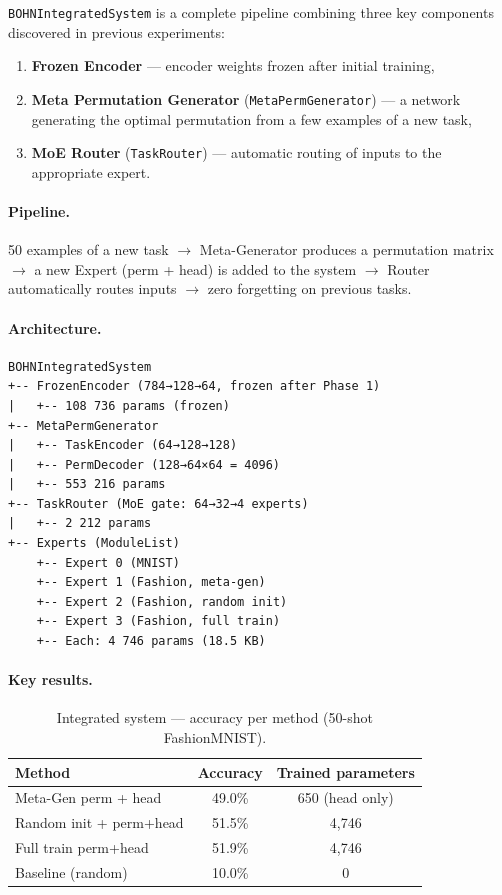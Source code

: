 \documentclass[11pt,a4paper]{report}
\begin{document}
\texttt{BOHNIntegratedSystem} is a complete pipeline combining three key components
discovered in previous experiments:

\begin{enumerate}
    \item \textbf{Frozen Encoder} --- encoder weights frozen after initial training,
    \item \textbf{Meta Permutation Generator} (\texttt{MetaPermGenerator}) --- a network generating the optimal permutation from a few examples of a new task,
    \item \textbf{MoE Router} (\texttt{TaskRouter}) --- automatic routing of inputs to the appropriate expert.
\end{enumerate}

\paragraph{Pipeline.}
50 examples of a new task $\to$ Meta-Generator produces a permutation matrix
$\to$ a new Expert (perm + head) is added to the system
$\to$ Router automatically routes inputs
$\to$ zero forgetting on previous tasks.

\paragraph{Architecture.}

\begin{verbatim}
BOHNIntegratedSystem
+-- FrozenEncoder (784→128→64, frozen after Phase 1)
|   +-- 108 736 params (frozen)
+-- MetaPermGenerator
|   +-- TaskEncoder (64→128→128)
|   +-- PermDecoder (128→64×64 = 4096)
|   +-- 553 216 params
+-- TaskRouter (MoE gate: 64→32→4 experts)
|   +-- 2 212 params
+-- Experts (ModuleList)
    +-- Expert 0 (MNIST)
    +-- Expert 1 (Fashion, meta-gen)
    +-- Expert 2 (Fashion, random init)
    +-- Expert 3 (Fashion, full train)
    +-- Each: 4 746 params (18.5 KB)
\end{verbatim}

\paragraph{Key results.}

\begin{table}[h!]
\centering
\caption{Integrated system --- accuracy per method (50-shot FashionMNIST).}
\begin{tabular}{l c c}
\hline
\textbf{Method} & \textbf{Accuracy} & \textbf{Trained parameters} \\
\hline
Meta-Gen perm + head & 49.0\% & 650 (head only) \\
Random init + perm+head & 51.5\% & 4,746 \\
Full train perm+head & 51.9\% & 4,746 \\
Baseline (random) & 10.0\% & 0 \\
\hline
\end{tabular}
\label{tab:integrated_fashion}
\end{table}
\end{document}
